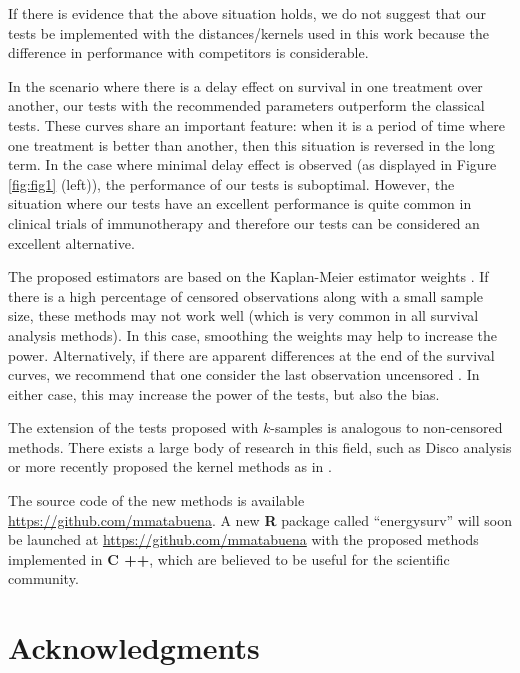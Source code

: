\documentclass[11pt]{article}
\begin{document}
If there is evidence that the above situation holds, we do not suggest that  our tests be implemented with the distances/kernels used in this work because the difference in performance with competitors is considerable.

In the  scenario where there is a delay effect on survival in one treatment over another, our tests with the recommended  parameters outperform  the classical tests. These curves share an  important feature: when it is a period of time where one treatment is better than another,  then  this situation is reversed in the long term. In the case where minimal delay effect is observed (as displayed in Figure \ref{fig:fig1} (left)),  the performance of our tests is suboptimal.  However, the situation where our tests have an excellent performance is quite common in clinical trials of immunotherapy \cite{alexander2018hazards} and therefore our tests can be considered an excellent alternative.

The proposed estimators are based on the Kaplan-Meier estimator weights \cite{stute1995statistical}. If there is a high percentage of censored observations along with a small sample size, these methods may not work well (which is very common in all survival analysis methods).  In this case, smoothing the weights may help to increase the power. Alternatively,  if there are apparent  differences at the end of the survival curves, we recommend that one consider  the last observation uncensored \cite{efron1967two}. In either case, this may increase the power of the tests, but also the bias.



The extension of the tests proposed with $k$-samples is analogous to  non-censored methods. There exists a large body of research  in this field, such as Disco analysis \cite{rizzo2010disco} or more recently proposed the kernel methods as in \cite{arm2018kernel}.



The  source code of the new methods is available \url{https://github.com/mmatabuena}. A new  \textbf{\textsf{R}} package  called ``energysurv'' will soon be  launched at \url{https://github.com/mmatabuena} with the proposed methods implemented in \textbf{\textsf{C ++}},  which are believed to be useful for the scientific community. 

\section*{Acknowledgments}
\end{document}
